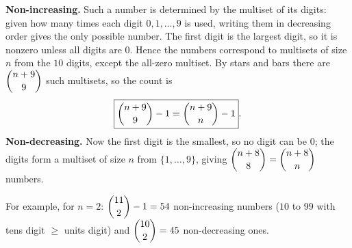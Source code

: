 \textbf{Non-increasing.} Such a number is determined by the multiset of its digits: given how many times each digit $0,1,\dots,9$ is used, writing them in decreasing order gives the only possible number. The first digit is the largest digit, so it is nonzero unless all digits are $0$. Hence the numbers correspond to multisets of size $n$ from the $10$ digits, except the all-zero multiset. By stars and bars there are $\dbinom{n+9}{9}$ such multisets, so the count is
\[
\boxed{\dbinom{n+9}{9}-1=\dbinom{n+9}{n}-1}.
\]
\textbf{Non-decreasing.} Now the first digit is the smallest, so no digit can be $0$; the digits form a multiset of size $n$ from $\{1,\dots,9\}$, giving $\dbinom{n+8}{8}=\dbinom{n+8}{n}$ numbers.

For example, for $n=2$: $\dbinom{11}{2}-1=54$ non-increasing numbers ($10$ to $99$ with tens digit $\ge$ units digit) and $\dbinom{10}{2}=45$ non-decreasing ones.
